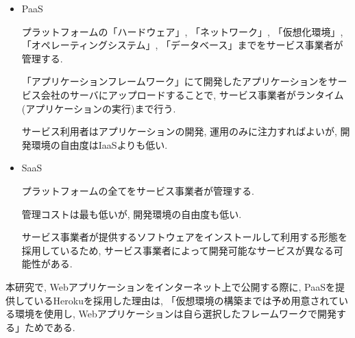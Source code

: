 \begin{description}
\begin{itemize}
\item PaaS

プラットフォームの「ハードウェア」, 「ネットワーク」, 「仮想化環境」, 「オペレーティングシステム」, 「データベース」までをサービス事業者が管理する.

「アプリケーションフレームワーク」にて開発したアプリケーションをサービス会社のサーバにアップロードすることで, サービス事業者がランタイム(アプリケーションの実行)まで行う.

サービス利用者はアプリケーションの開発, 運用のみに注力すればよいが, 開発環境の自由度はIaaSよりも低い.

\item SaaS

プラットフォームの全てをサービス事業者が管理する.

管理コストは最も低いが, 開発環境の自由度も低い.

サービス事業者が提供するソフトウェアをインストールして利用する形態を採用しているため, サービス事業者によって開発可能なサービスが異なる可能性がある.
\end{itemize}

\end{description}

本研究で, Webアプリケーションをインターネット上で公開する際に, PaaSを提供しているHerokuを採用した理由は, 「仮想環境の構築までは予め用意されている環境を使用し, Webアプリケーションは自ら選択したフレームワークで開発する」ためである.


